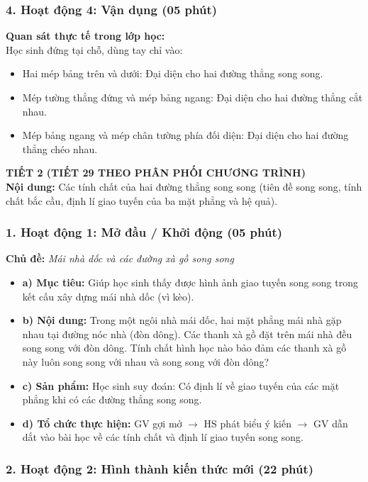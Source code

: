 \documentclass[12pt, a4paper]{article}
\begin{document}
\subsubsection*{4. Hoạt động 4: Vận dụng (05 phút)}
\textbf{Quan sát thực tế trong lớp học:}\\
Học sinh đứng tại chỗ, dùng tay chỉ vào:
\begin{itemize}
    \item Hai mép bảng trên và dưới: Đại diện cho hai đường thẳng song song.
    \item Mép tường thẳng đứng và mép bảng ngang: Đại diện cho hai đường thẳng cắt nhau.
    \item Mép bảng ngang và mép chân tường phía đối diện: Đại diện cho hai đường thẳng chéo nhau.
\end{itemize}

\newpage

{\large \textbf{TIẾT 2 (TIẾT 29 THEO PHÂN PHỐI CHƯƠNG TRÌNH)}}\\[0.3em]
\textbf{Nội dung:} Các tính chất của hai đường thẳng song song (tiên đề song song, tính chất bắc cầu, định lí giao tuyến của ba mặt phẳng và hệ quả).

\subsubsection*{1. Hoạt động 1: Mở đầu / Khởi động (05 phút)}
\textbf{Chủ đề:} \textit{Mái nhà dốc và các đường xà gồ song song}
\begin{itemize}
    \item \textbf{a) Mục tiêu:} Giúp học sinh thấy được hình ảnh giao tuyến song song trong kết cấu xây dựng mái nhà dốc (vì kèo).
    \item \textbf{b) Nội dung:} Trong một ngôi nhà mái dốc, hai mặt phẳng mái nhà gặp nhau tại đường nóc nhà (đòn dông). Các thanh xà gồ đặt trên mái nhà đều song song với đòn dông. Tính chất hình học nào bảo đảm các thanh xà gồ này luôn song song với nhau và song song với đòn dông?
    \item \textbf{c) Sản phẩm:} Học sinh suy đoán: Có định lí về giao tuyến của các mặt phẳng khi có các đường thẳng song song.
    \item \textbf{d) Tổ chức thực hiện:} GV gợi mở $\to$ HS phát biểu ý kiến $\to$ GV dẫn dắt vào bài học về các tính chất và định lí giao tuyến song song.
\end{itemize}

\subsubsection*{2. Hoạt động 2: Hình thành kiến thức mới (22 phút)}
\end{document}
